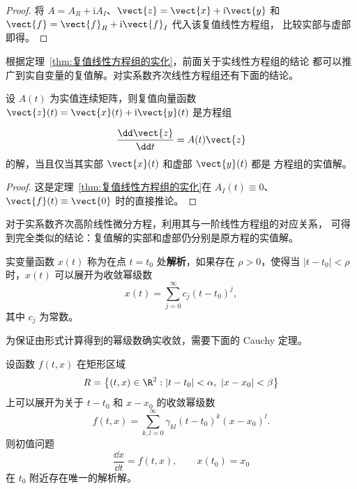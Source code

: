 \begin{proof}
	将 $A=A_R+\mathrm{i}A_I$、$\vect{z}=\vect{x}+\mathrm{i}\vect{y}$
	和 $\vect{f}=\vect{f}_R+\mathrm{i}\vect{f}_I$ 代入该复值线性方程组，
	比较实部与虚部即得。
\end{proof}

根据定理~\ref{thm:复值线性方程组的实化}，前面关于实线性方程组的结论
都可以推广到实自变量的复值解。对实系数齐次线性方程组还有下面的结论。

\begin{proposition}\label{thm:实系数齐次方程组的复值解}
	设 $A(t)$ 为实值连续矩阵，则复值向量函数
	$\vect{z}(t)=\vect{x}(t)+\mathrm{i}\vect{y}(t)$ 是方程组

	\[ 	\dfrac{\dd\vect{z}}{\dd t}=A(t)\vect{z}
 \]
	的解，当且仅当其实部 $\vect{x}(t)$ 和虚部 $\vect{y}(t)$ 都是
	方程组的实值解。
\end{proposition}

\begin{proof}
	这是定理~\ref{thm:复值线性方程组的实化}在
	$A_I(t)\equiv 0$、$\vect{f}(t)\equiv\vect{0}$ 时的直接推论。
\end{proof}

对于实系数齐次高阶线性微分方程，利用其与一阶线性方程组的对应关系，
可得到完全类似的结论：复值解的实部和虚部仍分别是原方程的实值解。

\begin{definition}\label{def:实解析函数}
	实变量函数 $x(t)$ 称为在点 $t=t_0$ 处\textbf{解析}，如果存在
	$\rho>0$，使得当 $|t-t_0|<\rho$ 时，$x(t)$ 可以展开为收敛幂级数
	\[
		x(t)=\sum_{j=0}^{\infty}c_j(t-t_0)^j,
	\]
	其中 $c_j$ 为常数。
\end{definition}

为保证由形式计算得到的幂级数确实收敛，需要下面的 Cauchy 定理。

\begin{theorem}[Cauchy 定理]\label{thm:Cauchy解析解定理}
	设函数 $f(t,x)$ 在矩形区域
	\[
		R=\bigl\{(t,x)\in\R^2:
		|t-t_0|<\alpha,\ |x-x_0|<\beta\bigr\}
	\]
	上可以展开为关于 $t-t_0$ 和 $x-x_0$ 的收敛幂级数
	\[
		f(t,x)=\sum_{k,l=0}^{\infty}
		\gamma_{kl}(t-t_0)^k(x-x_0)^l.
	\]
	则初值问题
	\[
		\dfrac{\dd x}{\dd t}=f(t,x),
		\qquad x(t_0)=x_0
	\]
	在 $t_0$ 附近存在唯一的解析解。
\end{theorem}

